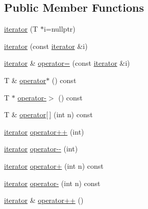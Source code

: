 \subsection*{Public Member Functions}
\begin{DoxyCompactItemize}
\item 
\hyperlink{classVector_1_1iterator_ac19ddeac03f06dfa9409375a389dc6b6_ac19ddeac03f06dfa9409375a389dc6b6}{iterator} (T $\ast$i=nullptr)
\item 
\hyperlink{classVector_1_1iterator_a824de93327bac2821ce81d67aa097436_a824de93327bac2821ce81d67aa097436}{iterator} (const \hyperlink{classVector_1_1iterator}{iterator} \&i)
\item 
\hyperlink{classVector_1_1iterator}{iterator} \& \hyperlink{classVector_1_1iterator_a872f28a0c1c29c65ff093a11723fb1a0_a872f28a0c1c29c65ff093a11723fb1a0}{operator=} (const \hyperlink{classVector_1_1iterator}{iterator} \&i)
\item 
T \& \hyperlink{classVector_1_1iterator_a55aa58a9c5917f66b6c2d57617e67036_a55aa58a9c5917f66b6c2d57617e67036}{operator$\ast$} () const
\item 
T $\ast$ \hyperlink{classVector_1_1iterator_a9ead9fe946e057e6d423d9c07b9439c4_a9ead9fe946e057e6d423d9c07b9439c4}{operator-\/$>$} () const
\item 
T \& \hyperlink{classVector_1_1iterator_ab317050a91c9bbc9cb3395824891c36c_ab317050a91c9bbc9cb3395824891c36c}{operator\mbox{[}$\,$\mbox{]}} (int n) const
\item 
\hyperlink{classVector_1_1iterator}{iterator} \hyperlink{classVector_1_1iterator_ac67c9225a0971d334d02246291922539_ac67c9225a0971d334d02246291922539}{operator++} (int)
\item 
\hyperlink{classVector_1_1iterator}{iterator} \hyperlink{classVector_1_1iterator_a4bbb51eb646080bf397665d903ad94d7_a4bbb51eb646080bf397665d903ad94d7}{operator-\/-\/} (int)
\item 
\hyperlink{classVector_1_1iterator}{iterator} \hyperlink{classVector_1_1iterator_ae04a470594c8475c04e229cd8711b585_ae04a470594c8475c04e229cd8711b585}{operator+} (int n) const
\item 
\hyperlink{classVector_1_1iterator}{iterator} \hyperlink{classVector_1_1iterator_a47db88e770bfa09969c5942b09c24c46_a47db88e770bfa09969c5942b09c24c46}{operator-\/} (int n) const
\item 
\hyperlink{classVector_1_1iterator}{iterator} \& \hyperlink{classVector_1_1iterator_a5016f39ffd22095b6fa9de87a5dac20e_a5016f39ffd22095b6fa9de87a5dac20e}{operator++} ()
\item 

\end{DoxyCompactItemize}
